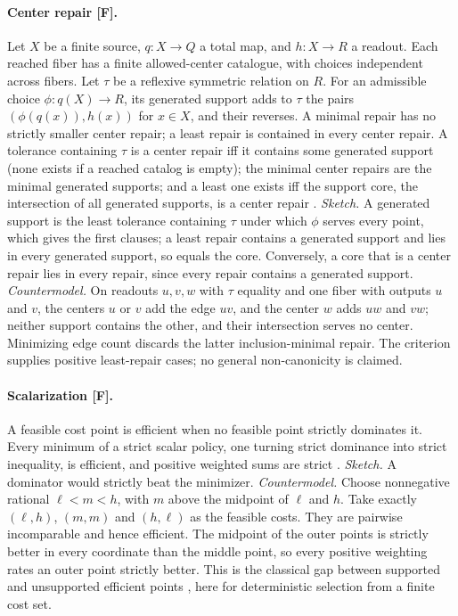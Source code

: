 \documentclass[pdflatex,sn-basic]{sn-jnl}%
\begin{document}
\begin{appendices}
\paragraph{Center repair [F].} Let $X$ be a finite source, $q:X\to Q$ a total map, and $h:X\to R$ a readout. Each reached fiber has a finite allowed-center catalogue, with choices independent across fibers. Let $\tau$ be a reflexive symmetric relation on $R$. For an admissible choice $\phi:q(X)\to R$, its generated support adds to $\tau$ the pairs $(\phi(q(x)),h(x))$ for $x\in X$, and their reverses. A minimal repair has no strictly smaller center repair; a least repair is contained in every center repair. A tolerance containing $\tau$ is a center repair iff it contains some generated support (none exists if a reached catalog is empty); the minimal center repairs are the minimal generated supports; and a least one exists iff the support core, the intersection of all generated supports, is a center repair \citep{tsiokos2026v4}. \emph{Sketch.} A generated support is the least tolerance containing $\tau$ under which $\phi$ serves every point, which gives the first clauses; a least repair contains a generated support and lies in every generated support, so equals the core. Conversely, a core that is a center repair lies in every repair, since every repair contains a generated support. \emph{Countermodel.} On readouts $u,v,w$ with $\tau$ equality and one fiber with outputs $u$ and $v$, the centers $u$ or $v$ add the edge $uv$, and the center $w$ adds $uw$ and $vw$; neither support contains the other, and their intersection serves no center. Minimizing edge count discards the latter inclusion-minimal repair. The criterion supplies positive least-repair cases; no general non-canonicity is claimed.

\paragraph{Scalarization [F].} A feasible cost point is efficient when no feasible point strictly dominates it. Every minimum of a strict scalar policy, one turning strict dominance into strict inequality, is efficient, and positive weighted sums are strict \citep{tsiokos2026v6}. \emph{Sketch.} A dominator would strictly beat the minimizer. \emph{Countermodel.} Choose nonnegative rational $\ell<m<h$, with $m$ above the midpoint of $\ell$ and $h$. Take exactly $(\ell,h)$, $(m,m)$ and $(h,\ell)$ as the feasible costs. They are pairwise incomparable and hence efficient. The midpoint of the outer points is strictly better in every coordinate than the middle point, so every positive weighting rates an outer point strictly better. This is the classical gap between supported and unsupported efficient points \citep{ehrgott2005}, here for deterministic selection from a finite cost set.


\end{appendices}
\end{document}
